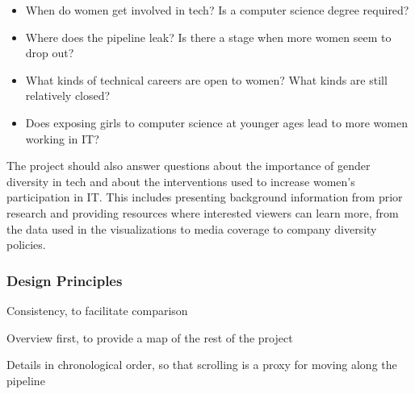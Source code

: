 \begin{itemize}
  \item When do women get involved in tech? Is a computer science degree required?
  \item Where does the pipeline leak? Is there a stage when more women seem to drop out?
  \item What kinds of technical careers are open to women? What kinds are still relatively closed?
  \item Does exposing girls to computer science at younger ages lead to more women working in IT\@?
\end{itemize}

The project should also answer questions about the importance of gender diversity in tech and about the interventions used to increase women's participation in IT\@. This includes presenting background information from prior research and providing resources where interested viewers can learn more, from the data used in the visualizations to media coverage to company diversity policies.

\subsubsection{Design Principles}\label{principles}

Consistency, to facilitate comparison

Overview first, to provide a map of the rest of the project

Details in chronological order, so that scrolling is a proxy for moving along the pipeline
